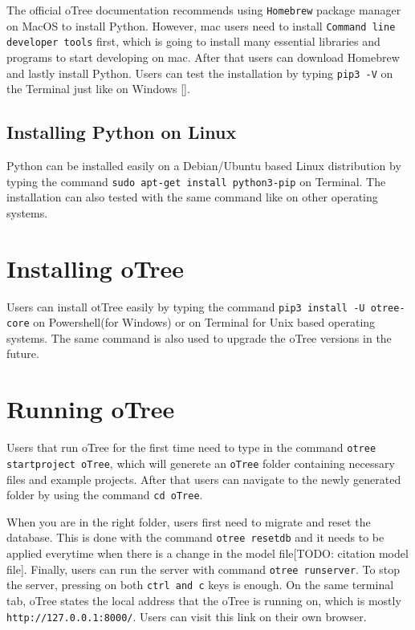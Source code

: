\begin{appendix}
The official oTree documentation recommends using \verb|Homebrew| package manager on MacOS to install Python. However, mac users need to install \verb|Command line developer tools| first, which is going to install many essential libraries and programs to start developing on mac. After that users can download Homebrew and lastly install Python. Users can test the installation by typing \verb|pip3 -V| on the Terminal just like on Windows [\cite{oTreeInstall2017}].

\subsection{Installing Python on Linux}

Python can be installed easily on a Debian/Ubuntu based Linux distribution by typing the command \verb|sudo apt-get install python3-pip| on Terminal. The installation can also tested with the same command like on other operating systems.

\section{Installing oTree}

Users can install otTree easily by typing the command \verb|pip3 install -U otree-core| on Powershell(for Windows) or on Terminal for Unix based operating systems. The same command is also used to upgrade the oTree versions in the future.

\section{Running oTree}

Users that run oTree for the first time need to type in the command \verb|otree startproject oTree|, which will generete an \verb|oTree| folder containing necessary files and example projects. After that users can navigate to the newly generated folder by using the command \verb|cd oTree|. 

When you are in the right folder, users first need to migrate and reset the database. This is done with the command \verb|otree resetdb| and it needs to be applied everytime when there is a change in the model file[TODO: citation model file]. Finally, users can run the server with command \verb|otree runserver|. To stop the server, pressing on both \verb|ctrl and c| keys is enough. On the same terminal tab, oTree states the local address that the oTree is running on, which is mostly \verb|http://127.0.0.1:8000/|. Users can visit this link on their own browser.


\end{appendix}
